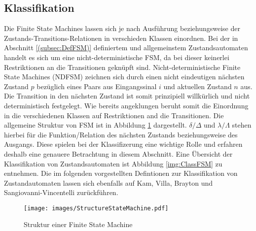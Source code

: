 \subsection{Klassifikation}
\label{(subsec:ClassFSM)}
Die Finite State Machines lassen sich je nach Ausführung beziehungsweise der Zustands-Transitions-Relationen in verschieden Klassen einordnen. Bei der in Abschnitt \ref{(subsec:DefFSM)} definiertem und allgemeinstem Zustandsautomaten handelt es sich um eine nicht-deterministische FSM, da bei dieser keinerlei Restriktionen an die Transitionen geknüpft sind. Nicht-deterministische Finite State Machines (NDFSM) zeichnen sich durch einen nicht eindeutigen nächsten Zustand $p$ bezüglich eines Paars aus Eingangssinal $i$ und aktuellen Zustand $n$ aus. Die Transition in den nächsten Zustand ist somit prinzipiell willkürlich und nicht deterministisch festgelegt. Wie bereits angeklungen beruht somit die Einordnung in die verschiedenen Klassen auf Restriktionen and die Transitionen. Die allgemeine Struktur von FSM ist in Abbildung \ref{img:StructFSM} dargestellt. $\delta / \Delta$ und $\lambda / \Lambda$ stehen hierbei für die Funktion/Relation des nächsten Zustands beziehungsweise des Ausgangs. Diese spielen bei der Klassifizerung eine wichtige Rolle und erfahren deshalb eine genauere Betrachtung in diesem Abschnitt. Eine Übersicht der Klassifikation von Zustandsautomaten ist Abbildung \ref{img:ClassFSM} zu entnehmen. Die im folgenden vorgestellten Defintionen zur Klassifikation von Zustandautomaten lassen sich ebenfalls auf Kam, Villa, Brayton und Sangiovanni-Vincentelli \cite{KVBS97} zurückführen.
\begin{figure}
	\centering
	\texttt{[image: images/StructureStateMachine.pdf]}
	\caption{Struktur einer Finite State Machine}
	\label{img:StructFSM}
\end{figure}

